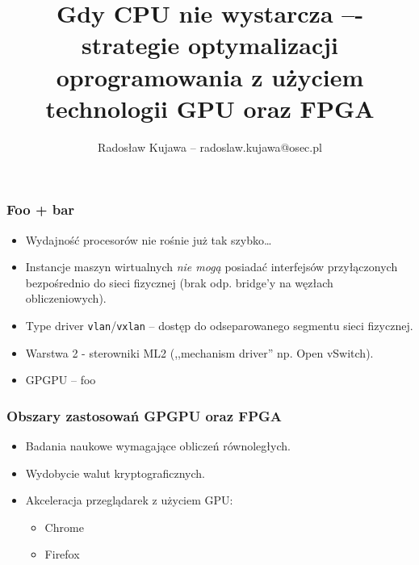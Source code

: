 \documentclass[dvipsnames,table]{beamer}
\title{Gdy CPU nie wystarcza –- strategie optymalizacji oprogramowania z użyciem technologii GPU oraz FPGA}
\author{Radosław Kujawa -- radoslaw.kujawa@osec.pl}
\institute{OSEC}
\begin{document}
\begin{frame}
	\titlepage
\end{frame}

\begin{frame}
	\frametitle{Foo + bar}
\begin{itemize}
	\item Wydajność procesorów nie rośnie już tak szybko\dots
	\item Instancje maszyn wirtualnych {\em nie mogą} posiadać interfejsów przyłączonych bezpośrednio do sieci fizycznej (brak odp. bridge'y na węzłach obliczeniowych).
	\item Type driver {\tt vlan}/{\tt vxlan} -- dostęp do odseparowanego segmentu sieci fizycznej.
	\item Warstwa 2 - sterowniki ML2 (,,mechanism driver'' np. Open vSwitch).
	\item GPGPU -- foo
\end{itemize}
\end{frame}


\begin{frame}
	\frametitle{Obszary zastosowań GPGPU oraz FPGA} 
\begin{itemize}
	\item Badania naukowe wymagające obliczeń równoległych.
	\item Wydobycie walut kryptograficznych.
	\item Akceleracja przeglądarek z użyciem GPU:
	\begin{itemize}
		\item Chrome
		\item Firefox
	\end{itemize}
\end{itemize}
\end{frame}
\end{document}
